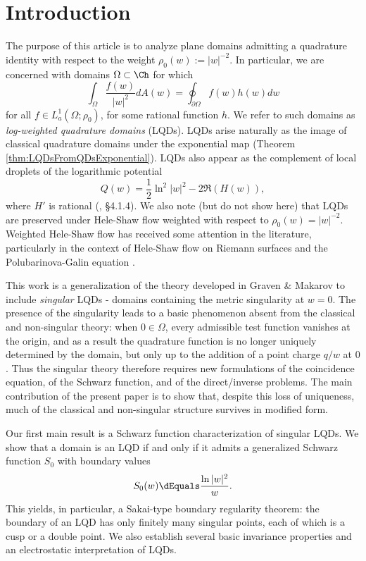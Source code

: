 \documentclass{article}
\numberwithin{equation}{section}
\begin{document}
\section{Introduction}\label{sec:Introduction}
The purpose of this article is to analyze plane domains admitting a quadrature identity with respect to the weight $\rho_0(w):=|w|^{-2}$. In particular, we are concerned with domains $\Omega\subset\Ch$ for which
\begin{equation}
\int_{\Omega}\dfrac{f(w)}{|w|^2}dA(w)=\oint_{\partial\Omega}f(w)h(w)dw
\end{equation}
for all $f\in L_a^1(\Omega;\rho_0)$, for some rational function $h$. We refer to such domains as \emph{log-weighted quadrature domains} (LQDs). LQDs arise naturally as the image of classical quadrature domains under the exponential map (Theorem \ref{thm:LQDsFromQDsExponential}). LQDs also appear as the complement of local droplets of the logarithmic potential
$$Q(w)=\frac{1}{2}\ln^2|w|^2-2\Re(H(w)),$$
where $H'$ is rational (\cite{GravenMakarov2025}, \S4.1.4). We also note (but do not show here) that LQDs are preserved under Hele-Shaw flow weighted with respect to $\rho_0(w)=|w|^{-2}$. Weighted Hele-Shaw flow has received some attention in the literature, particularly in the context of Hele-Shaw flow on Riemann surfaces and the Polubarinova-Galin equation \cite{hedenmalm2004HypHS,GustafssonLinPGRatFcns}.

This work is a generalization of the theory developed in Graven \& Makarov \cite{GravenMakarov2025} to include \emph{singular} LQDs - domains containing the metric singularity at $w=0$. The presence of the singularity leads to a basic phenomenon absent from the classical and non-singular theory: when $0\in\Omega$, every admissible test function vanishes at the origin, and as a result the quadrature function is no longer uniquely determined by the domain, but only up to the addition of a point charge $q/w$ at $0$. Thus the singular theory therefore requires new formulations of the coincidence equation, of the Schwarz function, and of the direct/inverse problems. The main contribution of the present paper is to show that, despite this loss of uniqueness, much of the classical and non-singular structure survives in modified form.

Our first main result is a Schwarz function characterization of singular LQDs. We show that a domain is an LQD if and only if it admits a generalized Schwarz function $S_0$ with boundary values
$$S_0(w)\dEquals\dfrac{\ln|w|^2}{w}.$$
This yields, in particular, a Sakai-type boundary regularity theorem: the boundary of an LQD has only finitely many singular points, each of which is a cusp or a double point. We also establish several basic invariance properties and an electrostatic interpretation of LQDs.
\end{document}

